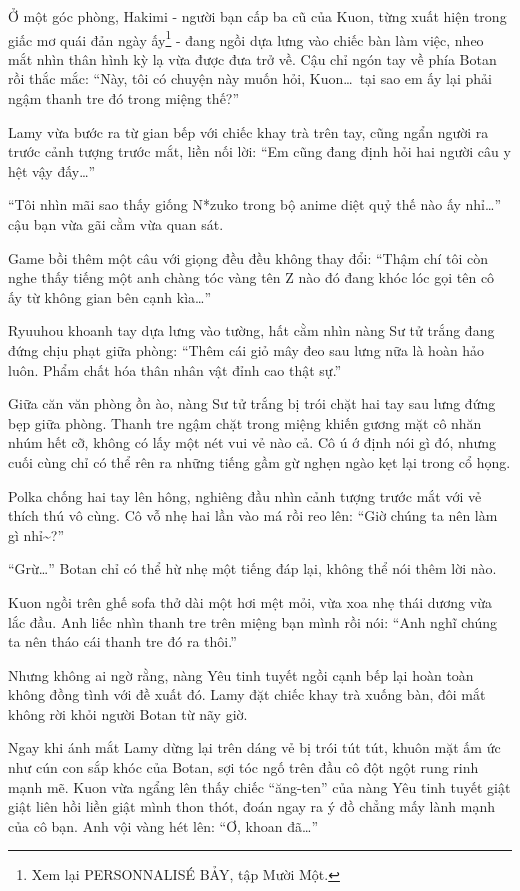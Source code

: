 \documentclass[../main.tex]{subfiles}
\begin{document}
Ở một góc phòng, Hakimi - người bạn cấp ba cũ của Kuon, từng xuất hiện trong giấc mơ quái đản ngày ấy\footnote{Xem lại {\flaregothic PERSONNALISÉ \vnmdisp BẢY}, tập Mười Một.} - đang ngồi dựa lưng vào chiếc bàn làm việc, nheo mắt nhìn thân hình kỳ lạ vừa được đưa trở về. Cậu chỉ ngón tay về phía Botan rồi thắc mắc: ``Này, tôi có chuyện này muốn hỏi, Kuon\dots\ tại sao em ấy lại phải ngậm thanh tre đó trong miệng thế?''

Lamy vừa bước ra từ gian bếp với chiếc khay trà trên tay, cũng ngẩn người ra trước cảnh tượng trước mắt, liền nối lời: ``Em cũng đang định hỏi hai người câu y hệt vậy đấy\dots''

``Tôi nhìn mãi sao thấy giống N*zuko trong bộ anime diệt quỷ thế nào ấy nhỉ\dots'' cậu bạn vừa gãi cằm vừa quan sát.

Game bồi thêm một câu với giọng đều đều không thay đổi: ``Thậm chí tôi còn nghe thấy tiếng một anh chàng tóc vàng tên Z nào đó đang khóc lóc gọi tên cô ấy từ không gian bên cạnh kìa\dots''

Ryuuhou khoanh tay dựa lưng vào tường, hất cằm nhìn nàng Sư tử trắng đang đứng chịu phạt giữa phòng: ``Thêm cái giỏ mây đeo sau lưng nữa là hoàn hảo luôn. Phẩm chất hóa thân nhân vật đỉnh cao thật sự.''

Giữa căn văn phòng ồn ào, nàng Sư tử trắng bị trói chặt hai tay sau lưng đứng bẹp giữa phòng. Thanh tre ngậm chặt trong miệng khiến gương mặt cô nhăn nhúm hết cỡ, không có lấy một nét vui vẻ nào cả. Cô ú ớ định nói gì đó, nhưng cuối cùng chỉ có thể rên ra những tiếng gầm gừ nghẹn ngào kẹt lại trong cổ họng.

Polka chống hai tay lên hông, nghiêng đầu nhìn cảnh tượng trước mắt với vẻ thích thú vô cùng. Cô vỗ nhẹ hai lần vào má rồi reo lên: ``Giờ chúng ta nên làm gì nhỉ\~{}?''

``Grừ\dots'' Botan chỉ có thể hừ nhẹ một tiếng đáp lại, không thể nói thêm lời nào.

Kuon ngồi trên ghế sofa thở dài một hơi mệt mỏi, vừa xoa nhẹ thái dương vừa lắc đầu. Anh liếc nhìn thanh tre trên miệng bạn mình rồi nói: ``Anh nghĩ chúng ta nên tháo cái thanh tre đó ra thôi.''

Nhưng không ai ngờ rằng, nàng Yêu tinh tuyết ngồi cạnh bếp lại hoàn toàn không đồng tình với đề xuất đó. Lamy đặt chiếc khay trà xuống bàn, đôi mắt không rời khỏi người Botan từ nãy giờ.

Ngay khi ánh mắt Lamy dừng lại trên dáng vẻ bị trói tút tút, khuôn mặt ấm ức như cún con sắp khóc của Botan, sợi tóc ngố trên đầu cô đột ngột rung rinh mạnh mẽ. Kuon vừa ngẩng lên thấy chiếc ``ăng-ten'' của nàng Yêu tinh tuyết giật giật liên hồi liền giật mình thon thót, đoán ngay ra ý đồ chẳng mấy lành mạnh của cô bạn. Anh vội vàng hét lên: ``Ơ, khoan đã\dots''
\end{document}
